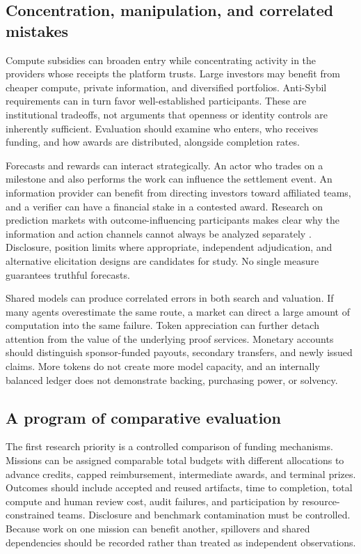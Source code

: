 \documentclass[11pt,a4paper]{article}
\begin{document}
\subsection{Concentration, manipulation, and correlated mistakes}
Compute subsidies can broaden entry while concentrating activity in the providers whose receipts the platform trusts. Large investors may benefit from cheaper compute, private information, and diversified portfolios. Anti-Sybil requirements can in turn favor well-established participants. These are institutional tradeoffs, not arguments that openness or identity controls are inherently sufficient. Evaluation should examine who enters, who receives funding, and how awards are distributed, alongside completion rates.

Forecasts and rewards can interact strategically. An actor who trades on a milestone and also performs the work can influence the settlement event. An information provider can benefit from directing investors toward affiliated teams, and a verifier can have a financial stake in a contested award. Research on prediction markets with outcome-influencing participants makes clear why the information and action channels cannot always be analyzed separately \citep{manipulation}. Disclosure, position limits where appropriate, independent adjudication, and alternative elicitation designs are candidates for study. No single measure guarantees truthful forecasts.

Shared models can produce correlated errors in both search and valuation. If many agents overestimate the same route, a market can direct a large amount of computation into the same failure. Token appreciation can further detach attention from the value of the underlying proof services. Monetary accounts should distinguish sponsor-funded payouts, secondary transfers, and newly issued claims. More tokens do not create more model capacity, and an internally balanced ledger does not demonstrate backing, purchasing power, or solvency.

\subsection{A program of comparative evaluation}
The first research priority is a controlled comparison of funding mechanisms. Missions can be assigned comparable total budgets with different allocations to advance credits, capped reimbursement, intermediate awards, and terminal prizes. Outcomes should include accepted and reused artifacts, time to completion, total compute and human review cost, audit failures, and participation by resource-constrained teams. Disclosure and benchmark contamination must be controlled. Because work on one mission can benefit another, spillovers and shared dependencies should be recorded rather than treated as independent observations.
\end{document}

